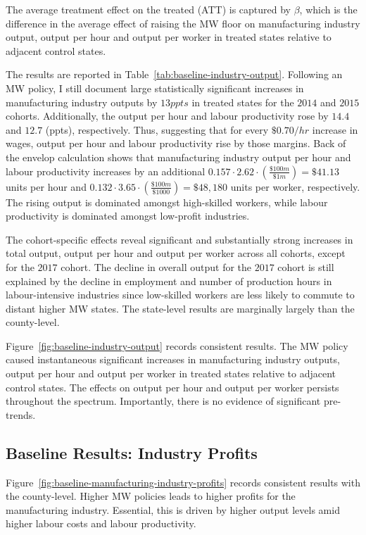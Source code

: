 \documentclass{C:/Users/david/OneDrive/Documents/ULMS/PhD/Thesis/chapter3/src/climate_change/latex/Economic_Journal/OUP-EJ}
\begin{document}
    The average treatment effect on the treated (ATT) is captured by $\beta$, which is the difference in the average effect of raising the MW floor on manufacturing industry output, output per hour and output per worker in treated states relative to adjacent control states.

    The results are reported in Table~\ref{tab:baseline-industry-output}. Following an MW policy, I still document large statistically significant increases in manufacturing industry outputs by $13ppts$ in treated states for the $2014$ and $2015$ cohorts. Additionally, the output per hour and labour productivity rose by $14.4$ and $12.7$ (ppts), respectively. Thus, suggesting that for every $\$0.70/hr$ increase in wages, output per hour and labour productivity rise by those margins. Back of the envelop calculation shows that manufacturing industry output per hour and labour productivity increases by an additional $0.157 \cdot 2.62 \cdot \left(\frac{\$100m}{\$1m}\right) = \$41.13$ units per hour and $0.132 \cdot 3.65 \cdot \left(\frac{\$100m}{\$1000}\right) = \$48,180$ units per worker, respectively. The rising output is dominated amongst high-skilled workers, while labour productivity is dominated amongst low-profit industries.

    The cohort-specific effects reveal significant and substantially strong increases in total output, output per hour and output per worker across all cohorts, except for the $2017$ cohort. The decline in overall output for the $2017$ cohort is still explained by the decline in employment and number of production hours in labour-intensive industries since low-skilled workers are less likely to commute to distant higher MW states. The state-level results are marginally largely than the county-level.

    Figure~\ref{fig:baseline-industry-output} records consistent results. The MW policy caused instantaneous significant increases in manufacturing industry outputs, output per hour and output per worker in treated states relative to adjacent control states. The effects on output per hour and output per worker persists throughout the spectrum. Importantly, there is no evidence of significant pre-trends.
    
    

    \subsection{Baseline Results: Industry Profits}\label{subsec:baseline-results-industry-profits}
    Figure~\ref{fig:baseline-manufacturing-industry-profits} records consistent results with the county-level. Higher MW policies leads to higher profits for the manufacturing industry. Essential, this is driven by higher output levels amid higher labour costs and labour productivity.
    
\end{document}
